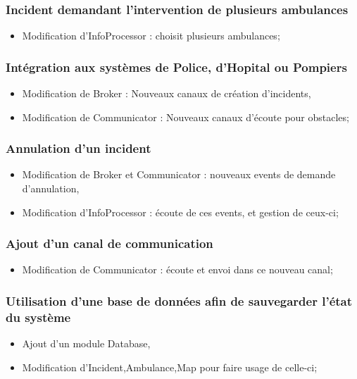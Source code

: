 	\subsubsection{Incident demandant l'intervention de plusieurs ambulances}
		\begin{itemize}
			\item Modification d'InfoProcessor : choisit plusieurs ambulances;
		\end{itemize}
	\subsubsection{Intégration aux systèmes de Police, d'Hopital ou Pompiers }
		\begin{itemize}
			\item Modification de Broker : Nouveaux canaux de création d'incidents,
			\item Modification de Communicator : Nouveaux canaux d'écoute pour obstacles;
		\end{itemize}
	\subsubsection{Annulation d'un incident}
		\begin{itemize}
			\item Modification de Broker et Communicator : nouveaux events de
			 	demande d'annulation,
			\item Modification d'InfoProcessor : écoute de ces events, et
				gestion de ceux-ci;
		\end{itemize}
	\subsubsection{Ajout d'un canal de communication}
		\begin{itemize}
			\item Modification de Communicator : écoute et envoi dans ce nouveau canal;
		\end{itemize}
	\subsubsection{Utilisation d'une base de données afin de sauvegarder l'état du système}
		\begin{itemize}
			\item Ajout d'un module Database,
			\item Modification d'Incident,Ambulance,Map pour faire usage de celle-ci;
		\end{itemize}
